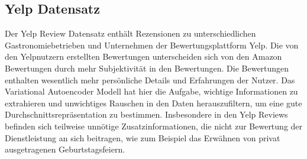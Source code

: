 



\subsection{Yelp Datensatz}
Der Yelp Review Datensatz \citep{meansum} enthält Rezensionen zu unterschiedlichen Gastronomiebetrieben und Unternehmen der Bewertungsplattform Yelp. 
Die von den Yelpnutzern erstellten Bewertungen unterscheiden sich von den Amazon Bewertungen durch mehr Subjektivität in den Bewertungen.
Die Bewertungen enthalten wesentlich mehr persönliche Details und Erfahrungen der Nutzer.
Das Variational Autoencoder Modell hat hier die Aufgabe, wichtige Informationen zu extrahieren und unwichtiges Rauschen in den Daten herauszufiltern, um eine gute Durchschnittsrepräsentation zu bestimmen.
Insbesondere in den Yelp Reviews befinden sich teilweise unnötige Zusatzinformationen, die nicht zur Bewertung der Dienstleistung an sich beitragen, wie zum Beispiel das Erwähnen von privat ausgetragenen Geburtstagsfeiern. 



